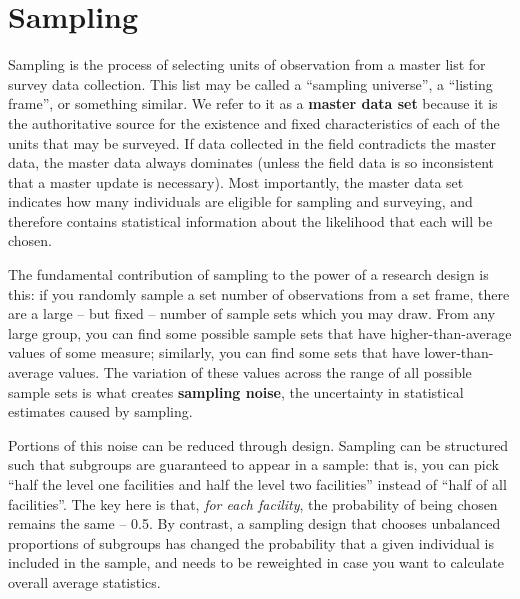 {
}

\section{Sampling}

Sampling is the process of selecting units of observation from a master list for survey data collection.
This list may be called a ``sampling universe'', a ``listing frame'', or something similar.
We refer to it as a \textbf{master data set} because it is the authoritative source
for the existence and fixed characteristics of each of the units that may be surveyed.
If data collected in the field contradicts the master data,
the master data always dominates (unless the field data is so inconsistent that a master update is necessary).
Most importantly, the master data set indicates how many individuals are eligible for sampling and surveying,
and therefore contains statistical information about the likelihood that each will be chosen.

The fundamental contribution of sampling to the power of a research design is this:
if you randomly sample a set number of observations from a set frame,
there are a large -- but fixed -- number of sample sets which you may draw.
From any large group, you can find some possible sample sets
that have higher-than-average values of some measure;
similarly, you can find some sets that have lower-than-average values.
The variation of these values across the range of all possible sample sets is what creates
\textbf{sampling noise}, the uncertainty in statistical estimates caused by sampling.

Portions of this noise can be reduced through design.
Sampling can be structured such that subgroups are guaranteed to appear in a sample:
that is, you can pick ``half the level one facilities and half the level two facilities'' instead of
``half of all facilities''. The key here is that, \textit{for each facility},
the probability of being chosen remains the same -- 0.5.
By contrast, a sampling design that chooses unbalanced proportions of subgroups
has changed the probability that a given individual is included in the sample,
and needs to be reweighted in case you want to calculate overall average statistics.

